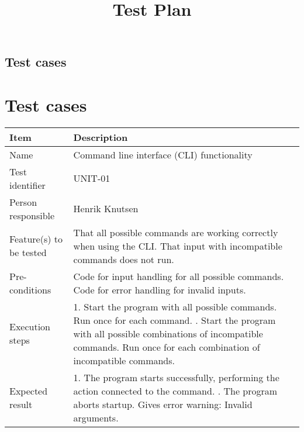 \documentclass[12pt, fullpage, oneside]{report}
\begin{document}
\title{Test Plan}

	\subsection*{Test cases}
	\section{Test cases}
		\vspace{8 mm}		

		\begin{center}
			\begin{tabular}{ |  p{3.5cm} | p{10cm} | }
				\hline
				Item & Description \\ [5pt] \hline \hline
				Name & Command line interface (CLI) functionality \\  [5pt] \hline
				Test identifier & UNIT-01 \\  [5pt] \hline
				Person responsible & Henrik Knutsen \\  [5pt] \hline
				Feature(s) to be tested & That all possible commands are working correctly when using the CLI. That input with incompatible commands does not run. \\  [5pt] \hline
				Pre-conditions & Code for input handling for all possible commands. Code for error handling for invalid inputs. \\  [5pt] \hline
				Execution steps & 1. Start the program with all possible commands. Run once for each command. \newline 2. Start the program with all possible combinations of incompatible commands. Run once for each combination of incompatible commands. \\  [5pt] \hline
				Expected result & 1. The program starts successfully, performing the action connected to the command. \newline 2. The program aborts startup. Gives error warning: Invalid arguments. \\  [5pt] \hline
			\end{tabular}
		\end{center}
\end{document}
